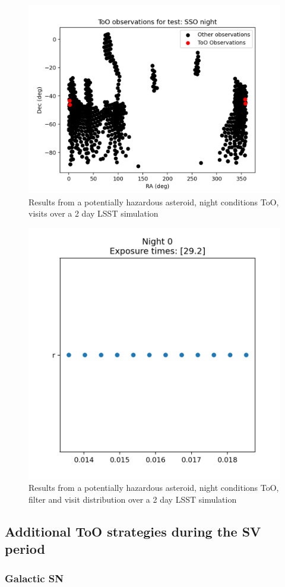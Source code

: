 \begin{figure}[h!]
    \centering
    \includegraphics[width=0.85\linewidth]{figures/validationTests/SVRequired/PHANightPosition.png}
    \caption{Results from a potentially hazardous asteroid, night conditions ToO, visits over a 2 day LSST simulation}
    \label{fig:PHANightPositionResult}
\end{figure}

\begin{figure}[h!]
    \centering
    \includegraphics[width=0.225\linewidth]{figures/validationTests/SVRequired/PHANightFilterPlot.png}
    \caption{Results from a potentially hazardous asteroid, night conditions ToO, filter and visit distribution over a 2 day LSST simulation}
    \label{fig:PHANightFilterResult}
\end{figure}
\clearpage

\subsection{Additional ToO strategies during the SV period}

\subsubsection{Galactic SN}

